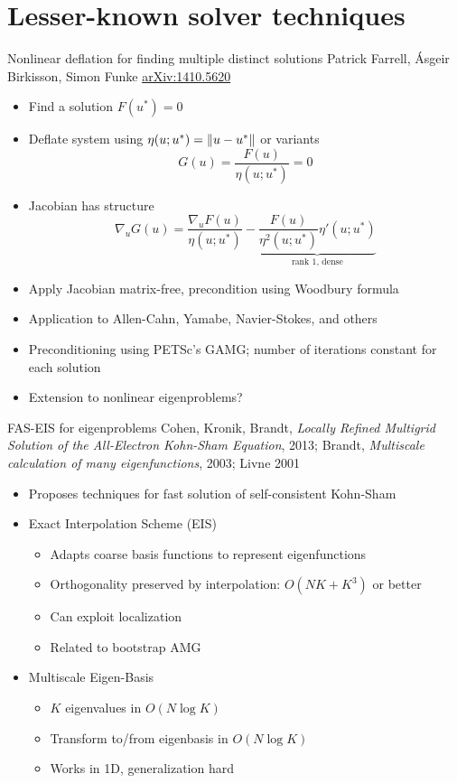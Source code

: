 \documentclass{beamer}
\begin{document}
\section{Lesser-known solver techniques}
\begin{frame}{Nonlinear deflation for finding multiple distinct solutions}
  Patrick Farrell, \'Asgeir Birkisson, Simon Funke \hyperref{http://arxiv.org/abs/1410.5620}{}{}{arXiv:1410.5620}
  \begin{itemize}
  \item Find a solution $F(u^*) = 0$
  \item Deflate system using $\eta(u;u^*) = \left\lVert u - u^* \right\rVert$ or variants
    \begin{equation*}
      G(u) = \frac{F(u)}{\eta(u;u^*)} = 0
    \end{equation*}
  \item Jacobian has structure
    \begin{equation*}
      \nabla_u G(u) = \frac{\nabla_u F(u)}{\eta(u;u^*)} - \underbrace{\frac{F(u)}{\eta^2(u;u^*)} \eta'(u;u^*)}_{\text{rank 1, dense}}
    \end{equation*}
  \item Apply Jacobian matrix-free, precondition using Woodbury formula
  \item Application to Allen-Cahn, Yamabe, Navier-Stokes, and others
  \item Preconditioning using PETSc's GAMG; number of iterations constant for each solution
  \item Extension to nonlinear eigenproblems?
  \end{itemize}
\end{frame}

\begin{frame}{FAS-EIS for eigenproblems}
  Cohen, Kronik, Brandt, {\it Locally Refined Multigrid Solution of the All-Electron
Kohn-Sham Equation}, 2013; Brandt, {\it Multiscale calculation of many eigenfunctions}, 2003; Livne 2001
  \begin{itemize}
  \item Proposes techniques for fast solution of self-consistent Kohn-Sham
  \item Exact Interpolation Scheme (EIS)
    \begin{itemize}
    \item Adapts coarse basis functions to represent eigenfunctions
    \item Orthogonality preserved by interpolation: $O(N K + K^3)$ or better
    \item Can exploit localization
    \item Related to bootstrap AMG
    \end{itemize}
  \item Multiscale Eigen-Basis
    \begin{itemize}
    \item $K$ eigenvalues in $O(N \log K)$
    \item Transform to/from eigenbasis in $O(N \log K)$
    \item Works in 1D, generalization hard
    \end{itemize}
  \end{itemize}
\end{frame}
\end{document}
